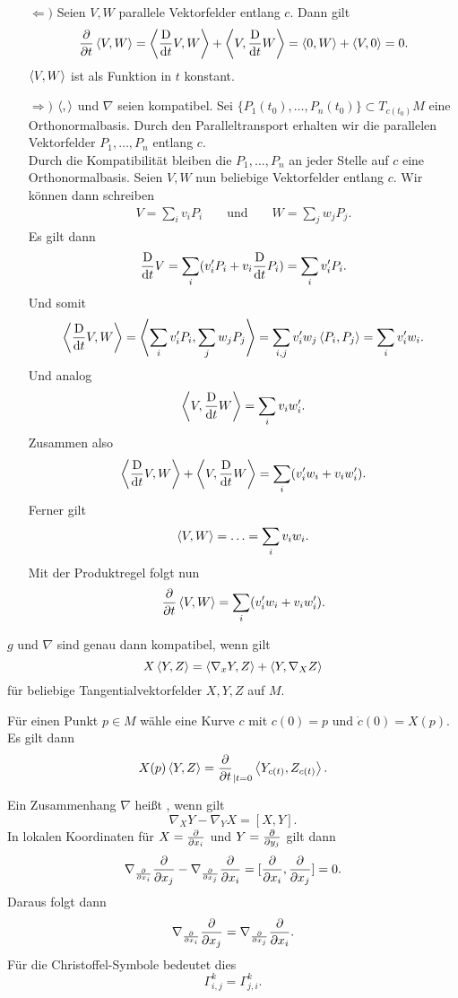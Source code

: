 \begin{Beweis}{}
\begin{itemize}
	\item[$\Leftarrow )$] Seien $V,W$ parallele Vektorfelder entlang $c$. Dann gilt
	\[\frac{\partial }{\partial t}\left<V,W\right> = \left< \frac{\text{D}}{\text{d} t}V, W \right> +\left<V, \frac{\text{D}}{\text{d} t} W\right> = \left< 0, W \right> +\left<V, 0\right> = 0. \]
	$\left<V,W\right>$ ist als Funktion in $t$ konstant.
	\item[$\Rightarrow )$] $\left<,\right>$ und $\nabla$ seien kompatibel. Sei $\{ P_1(t_0), \ldots, P_n(t_0) \} \subset T_{c(t_0)}M$ eine Orthonormalbasis. Durch den Paralleltransport erhalten wir die parallelen Vektorfelder $P_1, \ldots, P_n$ entlang $c$.\\
	Durch die Kompatibilität bleiben die $P_1, \ldots, P_n$ an jeder Stelle auf $c$ eine Orthonormalbasis. Seien $V,W$ nun beliebige Vektorfelder entlang $c$. Wir können dann schreiben
	\begin{align*}
	V = \sum_i v_i P_i && \text{ und } && W = \sum_j w_j P_j.
	\end{align*}
	Es gilt dann
	\[ \frac{\text{D}}{\text{d} t}V = \sum_i (v_i' P_i + v_i \frac{\text{D}}{\text{d} t}P_i) = \sum_i v_i' P_i. \]
	Und somit
	\[ \left<\frac{\text{D}}{\text{d} t}V, W\right> = \left< \sum_i v_i' P_i , \sum_j w_j P_j  \right> = \sum_{i,j} v_i'w_j\left<P_i,P_j\right> = \sum_i v_i'w_i. \]
	Und analog
	\[ \left<V, \frac{\text{D}}{\text{d} t}W\right> =  \sum_i v_iw_i'. \]
	Zusammen also
	\[\left<\frac{\text{D}}{\text{d} t}V, W\right> + \left<V, \frac{\text{D}}{\text{d} t}W\right> = \sum_i (v_i'w_i + v_i w_i'). \]
	Ferner gilt
	\[ \left<V,W\right> = \ldots = \sum_i v_i w_i. \]
	Mit der Produktregel folgt nun
	\[ \frac{\partial }{\partial t} \left<V,W\right> = \sum_i (v_i'w_i + v_i w_i'). \]
\end{itemize}
\end{Beweis}

\Kor{}
$g$ und $\nabla$ sind genau dann kompatibel, wenn gilt
\[ X\left<Y,Z\right> = \left<\nabla_x Y, Z\right> + \left<Y, \nabla_X Z\right> \]
für beliebige Tangentialvektorfelder $X,Y,Z$ auf $M$.
\begin{Beweis}{}
Für einen Punkt $p \in M$ wähle eine Kurve $c$ mit $c(0) = p$ und $\dot{c}(0) = X(p)$. Es gilt dann
\[ X(p)\left<Y,Z\right> = \frac{\partial }{\partial t}_{|t = 0} \left<Y_{c(t)}, Z_{c(t)}\right>. \]
\end{Beweis}

Ein Zusammenhang $\nabla$ heißt , wenn gilt
\[ \nabla_{X} Y - \nabla_YX = [X,Y]. \]
In lokalen Koordinaten für $X = \frac{\partial }{\partial x_i}$ und $Y = \frac{\partial }{\partial y_j}$ gilt dann
\[ \nabla_{\frac{\partial }{\partial x_i}}\frac{\partial }{\partial x_j} - \nabla_{\frac{\partial }{\partial x_j}}\frac{\partial }{\partial x_i} = [\frac{\partial }{\partial x_i}, \frac{\partial }{\partial x_j}] = 0. \]
Daraus folgt dann
\[ \nabla_{\frac{\partial }{\partial x_i}}\frac{\partial }{\partial x_j} = \nabla_{\frac{\partial }{\partial x_j}}\frac{\partial }{\partial x_i}. \]
Für die Christoffel-Symbole bedeutet dies
\[ \Gamma_{i,j}^k = \Gamma_{j,i}^k. \]

